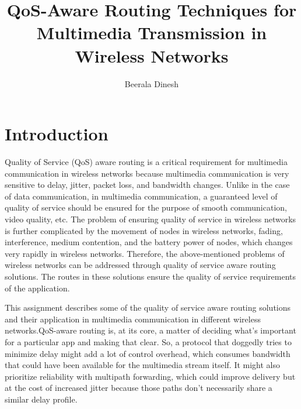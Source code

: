 \documentclass[12pt]{article}
\title{QoS-Aware Routing Techniques for Multimedia
Transmission in Wireless Networks}
\author{Beerala Dinesh}
\date{}
\begin{document}
	\maketitle
	
	\section{Introduction}
	Quality of Service (QoS) aware routing\cite{Goyal2023} is a critical requirement for multimedia communication in wireless networks because multimedia communication is very sensitive to delay, jitter, packet loss, and bandwidth changes. Unlike in the case of data communication, in multimedia communication, a guaranteed level of quality of service should be ensured for the purpose of smooth communication, video quality, etc. The problem of ensuring quality of service in wireless networks is further complicated by the movement of nodes in wireless networks, fading, interference, medium contention, and the battery power of nodes, which changes very rapidly in wireless networks. Therefore, the above-mentioned problems of wireless networks can be addressed through quality of service aware routing solutions. The routes in these solutions ensure the quality of service requirements of the application.

    
    This assignment describes some of the quality of service aware routing solutions and their application in multimedia communication in different wireless networks.QoS-aware routing is, at its core, a matter of deciding what's important for a particular app and making that clear. So, a protocol that doggedly tries to minimize delay might add a lot of control overhead, which consumes bandwidth that could have been available for the multimedia stream itself. It might also prioritize reliability with multipath forwarding, which could improve delivery but at the cost of increased jitter because those paths don't necessarily share a similar delay profile. 
\end{document}
